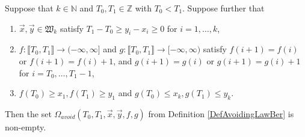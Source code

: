 \begin{lemma}\label{LemmaWD} Suppose that $k \in \mathbb{N}$ and $T_0, T_1 \in \mathbb{Z}$ with $T_0 < T_1$. Suppose further that 
\begin{enumerate}
\item $\vec{x}, \vec{y} \in \mathfrak{W}_k$ satisfy $T_1 - T_0 \geq y_i - x_i \geq 0$ for $i = 1, \dots, k$,
\item $f : \llbracket T_0, T_1 \rrbracket \rightarrow (-\infty, \infty]$ and $g : \llbracket T_0, T_1 \rrbracket \rightarrow [-\infty, \infty)$ satisfy $f (i+1) = f(i)$ or $f(i+1) = f(i) + 1$, and $g(i+1) = g(i)$ or $g(i+1) = g(i) +1$ for $i = T_0, \dots, T_1 -1$,
\item $f(T_0) \geq x_1, f(T_1) \geq y_1$ and $g(T_0) \leq x_k, g(T_1) \leq y_k$.
\end{enumerate}
Then the set $\Omega_{avoid}(T_0, T_1, \vec{x}, \vec{y}, f,g)$ from Definition \ref{DefAvoidingLawBer} is non-empty.
\end{lemma}

